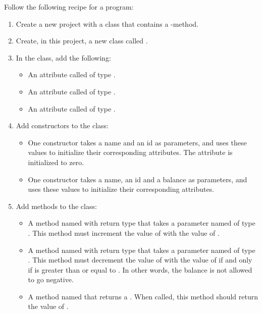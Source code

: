 Follow the following recipe for a program:
\begin{enumerate}
  \item Create a new project with a class that contains a -method.
  \item Create, in this project, a new class called .
  \item In the  class, add the following:
    \begin{itemize}
      \item An attribute called  of type .
      \item An attribute called  of type . %
      \item An attribute called  of type .
    \end{itemize}
  \item Add constructors to the  class:
    \begin{itemize}
      \item One constructor takes a name and an id as parameters, and uses these values to initialize their corresponding attributes. The  attribute is initialized to zero.
      \item One constructor takes a name, an id and a balance as parameters, and uses these values to initialize their corresponding attributes.
    \end{itemize}
  \item Add methods to the  class:
    \begin{itemize}
      \item A method named  with  return type that takes a parameter named  of type . This method must increment the value of  with the value of .
      \item A method named  with  return type that takes a parameter named  of type . This method must decrement the value of  with the value of  if and only if  is greater than or equal to . In other words, the balance is not allowed to go negative.
      \item A method named  that returns a . When called, this method should return the value of .

\end{itemize}
\end{enumerate}
